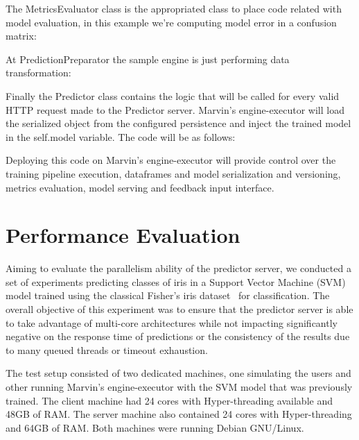 \documentclass[twoside,11pt]{article}
\begin{document}
The MetricsEvaluator class is the appropriated class to place code related with model evaluation, in this example we're computing model error in a confusion matrix:



At PredictionPreparator the sample engine is just performing data transformation:


Finally the Predictor class contains the logic that will be called for every valid HTTP request made to the Predictor server. Marvin's engine-executor will load the serialized object from the configured persistence and inject the trained model in the self.model variable. The code will be as follows:


Deploying this code on Marvin's engine-executor will provide control over the training pipeline execution, dataframes and model serialization and versioning, metrics evaluation, model serving and feedback input interface.

\section{Performance Evaluation}

Aiming to evaluate the parallelism ability of the predictor server, we conducted a set of experiments predicting classes of iris in a Support Vector Machine (SVM)~\citep{hearst1998support} model trained using the classical Fisher's iris dataset~\citep{fisher1936use} for classification. The overall objective of this experiment was to ensure that the predictor server is able to take advantage of multi-core architectures while not impacting significantly negative on the response time of predictions or the consistency of the results due to many queued threads or timeout exhaustion.

The test setup consisted of two dedicated machines, one simulating the users and other running Marvin's engine-executor with the SVM model that was previously trained. The client machine had 24 cores with Hyper-threading available and 48GB of RAM. The server machine also contained 24 cores with Hyper-threading and 64GB of RAM. Both machines were running Debian GNU/Linux.
\end{document}
